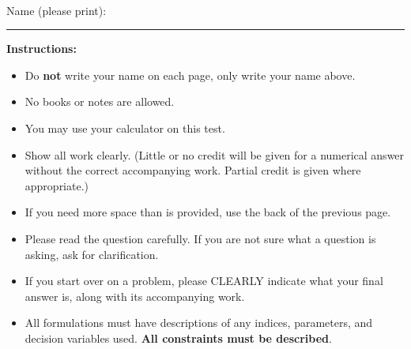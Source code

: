 \documentclass[12pt]{article}
\begin{document}


\newpage

 \pagestyle{empty}



\noindent



 \\

\smskip

\noindent

\vspace{1.0cm}
\noindent
Name (please print): \ \ \rule{10cm}{.1mm}  \quad  
\vspace{1cm}


\noindent
{\bf Instructions:}
\\
\begin{itemize}
\item Do {\bf not} write your name on each page, only write your name above.

\item No books or notes %
 are allowed. %

\item You may use your calculator on this test.

\item Show all work clearly. (Little or no credit will be given for a numerical
answer without the correct accompanying work.
Partial credit is given where appropriate.) 

\item If you need more space than is provided, use the back of the previous page. 

\item Please read the question carefully.
If you are not sure what a question is
asking, ask for clarification.

\item If you start over on a problem, please CLEARLY indicate what your final
  answer is, along with its accompanying work.

\item All formulations must have descriptions of any indices, parameters, and decision variables used. {\bf All constraints must be described}. 
\end{itemize}
\end{document}
